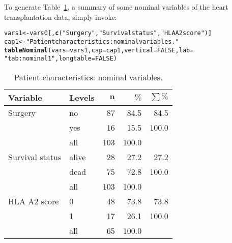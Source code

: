 \documentclass[nojss]{jss}\usepackage[]{graphicx}\usepackage[]{color}
\makeatletter
\newcommand{\hlnum}[1]{\textcolor[rgb]{0.686,0.059,0.569}{#1}}%
\newcommand{\hlstr}[1]{\textcolor[rgb]{0.192,0.494,0.8}{#1}}%
\newcommand{\hlstd}[1]{\textcolor[rgb]{0.345,0.345,0.345}{#1}}%
\newcommand{\hlkwb}[1]{\textcolor[rgb]{0.69,0.353,0.396}{#1}}%
\newcommand{\hlkwc}[1]{\textcolor[rgb]{0.333,0.667,0.333}{#1}}%
\newcommand{\hlkwd}[1]{\textcolor[rgb]{0.737,0.353,0.396}{\textbf{#1}}}%
\newenvironment{kframe}{%
 \def\at@end@of@kframe{}%
 \ifinner\ifhmode%
  \def\at@end@of@kframe{\end{minipage}}%
  \begin{minipage}{\columnwidth}%
 \fi\fi%
 \def\FrameCommand##1{\hskip\@totalleftmargin \hskip-\fboxsep
 \colorbox{shadecolor}{##1}\hskip-\fboxsep
     \hskip-\linewidth \hskip-\@totalleftmargin \hskip\columnwidth}%
 \MakeFramed {\advance\hsize-\width
   \@totalleftmargin\z@ \linewidth\hsize
   \@setminipage}}%
 {\par\unskip\endMakeFramed%
 \at@end@of@kframe}
\newenvironment{knitrout}{}{} %
\makeatother
\begin{document}
To generate Table~\ref{tab: nominal1}, a summary of some nominal variables of the heart
transplantation data, simply invoke:
 
\begin{knitrout}\footnotesize
{}\color{fgcolor}\begin{kframe}
\begin{alltt}
\hlstd{vars1} \hlkwb{<-} \hlstd{vars0[,} \hlkwd{c}\hlstd{(}\hlstr{"Surgery"}\hlstd{,} \hlstr{"Survival status"}\hlstd{,} \hlstr{"HLA A2 score"}\hlstd{)]}
\hlstd{cap1} \hlkwb{<-} \hlstr{"Patient characteristics: nominal variables."}
\hlkwd{tableNominal}\hlstd{(}\hlkwc{vars} \hlstd{= vars1,} \hlkwc{cap} \hlstd{= cap1,} \hlkwc{vertical} \hlstd{=} \hlnum{FALSE}\hlstd{,} \hlkwc{lab} \hlstd{=}
  \hlstr{"tab: nominal1"}\hlstd{,} \hlkwc{longtable} \hlstd{=} \hlnum{FALSE}\hlstd{)}
\end{alltt}
\end{kframe}
\end{knitrout}

\renewcommand{\baselinestretch}{1.15}
\begin{center}
\begin{table}[ht]
\centering
{\footnotesize
\begin{tabular}{llrrr}
 \textbf{Variable} & \textbf{Levels} & $\mathbf{n}$ & $\mathbf{\%}$ & $\mathbf{\sum \%}$ \\ 
  \hline
Surgery & no & 87 & 84.5 & 84.5 \\ 
   & yes & 16 & 15.5 & 100.0 \\ 
   \hline
 & all & 103 & 100.0 &  \\ 
   \hline
\hline
Survival status & alive & 28 & 27.2 & 27.2 \\ 
   & dead & 75 & 72.8 & 100.0 \\ 
   \hline
 & all & 103 & 100.0 &  \\ 
   \hline
\hline
HLA A2 score & 0 & 48 & 73.8 & 73.8 \\ 
   & 1 & 17 & 26.1 & 100.0 \\ 
   \hline
 & all & 65 & 100.0 &  \\ 
   \hline
\hline
\end{tabular}
}
\caption{Patient characteristics: nominal variables.} 
\label{tab: nominal1}
\end{table}

\end{center}
\renewcommand{\baselinestretch}{1}
\end{document}
